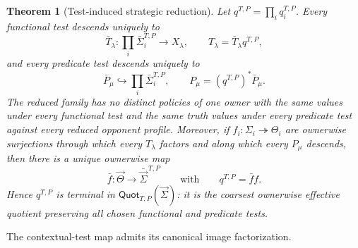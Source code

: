 \documentclass[11pt,a4paper]{article}
\numberwithin{equation}{section}
\newtheorem{theorem}{Theorem}[section]
\theoremstyle{definition}
\theoremstyle{remark}
\theoremstyle{plain}
\begin{document}
\begin{theorem}[Test-induced strategic reduction]
\label{thm:egt-test-quotient}
Let $q^{T,P}=\prod_iq_i^{T,P}$. Every functional test descends uniquely to
\[
 \bar T_\lambda:\prod_i\bar\Sigma_i^{T,P}\longrightarrow X_\lambda,
 \qquad
 T_\lambda=\bar T_\lambda q^{T,P},
\]
and every predicate test descends uniquely to
\[
 \bar P_\mu\hookrightarrow\prod_i\bar\Sigma_i^{T,P},
 \qquad
 P_\mu=(q^{T,P})^*\bar P_\mu.
\]
The reduced family has no distinct policies of one owner with the same values
under every functional test and the same truth values under every predicate
test against every reduced opponent profile. Moreover, if
$f_i:\Sigma_i\twoheadrightarrow\Theta_i$ are ownerwise surjections through
which every $T_\lambda$ factors and along which every $P_\mu$ descends, then
there is a unique ownerwise map
\[
 \bar f:\vec\Theta\longrightarrow\bar{\vec\Sigma}^{\,T,P}
 \qquad\text{with}\qquad
 q^{T,P}=\bar f f.
\]
Hence $q^{T,P}$ is terminal in $\mathsf{Quot}_{T,P}(\vec\Sigma)$: it is the
coarsest ownerwise effective quotient preserving all chosen functional and
predicate tests.
\end{theorem}

\noindent The contextual-test map admits its canonical image factorization.
\begin{center}
\end{center}
\end{document}
